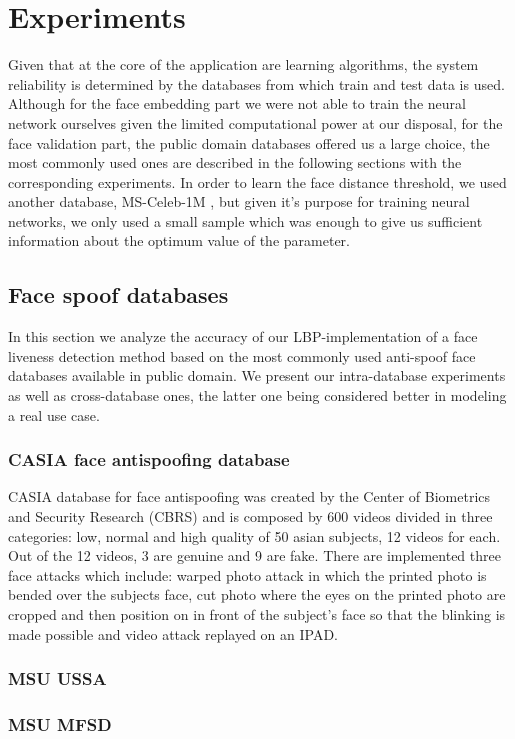 \chapter{Experiments}
Given that at the core of the application are learning algorithms, the system reliability is determined by the databases from which train and test data is used. Although for the face embedding part we were not able to train the neural network ourselves given the limited computational power at our disposal, for the face validation part, the public domain databases offered us a large choice, the most commonly used ones are described in the following sections with the corresponding experiments. In order to learn the face distance threshold, we used another database, MS-Celeb-1M \cite{guo2016msceleb}, but given it's purpose for training neural networks, we only used a small sample which was enough to give us sufficient information about the optimum value of the parameter.
\section{Face spoof databases}
In this section we analyze the accuracy of our LBP-implementation of a face liveness detection method based on the most commonly used anti-spoof face databases available in public domain. We present our intra-database experiments as well as cross-database ones, the latter one being considered better in modeling a real use case.
\subsection{CASIA face antispoofing database }
CASIA database for face antispoofing was created by the Center of Biometrics and Security Research (CBRS) and is composed by 600 videos divided in three categories: low, normal and high quality of 50 asian subjects, 12 videos for each. Out of the 12 videos, 3 are genuine and 9 are fake. There are implemented three face attacks which include: warped photo attack in which the printed photo is bended over the subjects face, cut photo where the eyes on the printed photo are cropped and then position on in front of the subject's face so that the blinking is made possible and video attack replayed on an IPAD.

\subsection{MSU USSA}
\subsection{MSU MFSD}
